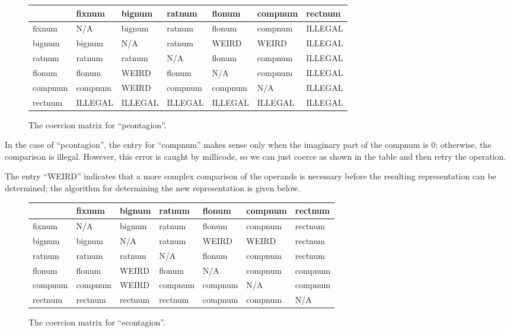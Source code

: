 \begin{figure}[hbt]
\begin{center}
\begin{tabular}{|l||l|l|l|l|l|l|} \hline
        & fixnum  & bignum  & ratnum  & flonum  & compnum & rectnum\\ \hline \hline
fixnum  & N/A     & bignum  & ratnum  & flonum  & compnum & ILLEGAL \\ \hline
bignum  & bignum  & N/A     & ratnum  & WEIRD   & WEIRD   & ILLEGAL   \\ \hline
ratnum  & ratnum  & ratnum  & N/A     & flonum  & compnum & ILLEGAL \\ \hline
flonum  & flonum  & WEIRD   & flonum  & N/A     & compnum & ILLEGAL \\ \hline
compnum & compnum & WEIRD   & compnum & compnum & N/A     & ILLEGAL \\ \hline
rectnum & ILLEGAL & ILLEGAL & ILLEGAL & ILLEGAL & ILLEGAL & ILLEGAL \\ \hline
\end{tabular}
\end{center}
\caption{The coercion matrix for ``pcontagion''.}
\label{pcontagion}
\end{figure}

In the case of ``pcontagion'', the entry for ``compnum'' makes sense
only when the imaginary part of the compnum is 0; otherwise, the
comparison is illegal. However, this error is caught by millicode, so we
can just coerce as shown in the table and then retry the operation.

The entry ``WEIRD'' indicates that a more complex comparison of the operands
is necessary before the resulting representation can be determined; the
algorithm for determining the new representation is given below.

\begin{figure}[hbt]
\begin{center}
\begin{tabular}{|l||l|l|l|l|l|l|} \hline
        & fixnum  & bignum  & ratnum  & flonum  & compnum & rectnum\\ \hline \hline
fixnum  & N/A     & bignum  & ratnum  & flonum  & compnum & rectnum \\ \hline
bignum  & bignum  & N/A     & ratnum  & WEIRD   & WEIRD   & rectnum \\ \hline
ratnum  & ratnum  & ratnum  & N/A     & flonum  & compnum & rectnum \\ \hline
flonum  & flonum  & WEIRD   & flonum  & N/A     & compnum & compnum \\ \hline
compnum & compnum & WEIRD   & compnum & compnum & N/A     & compnum \\ \hline
rectnum & rectnum & rectnum & rectnum & compnum & compnum & N/A     \\ \hline
\end{tabular}
\end{center}
\caption{The coercion matrix for ``econtagion''.}
\label{econtagion}
\end{figure}

